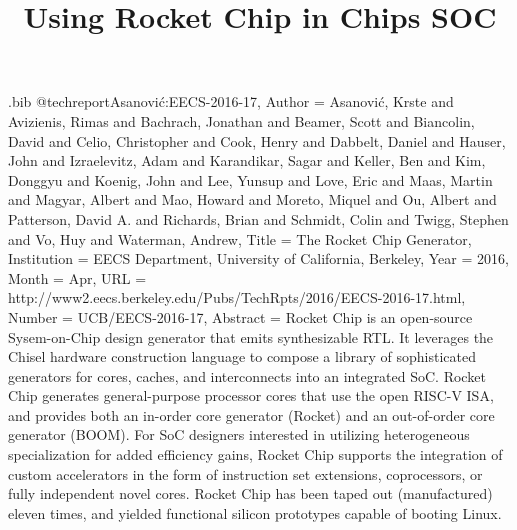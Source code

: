 \begin{filecontents*}{\jobname.bib}
@techreport{Asanović:EECS-2016-17,
    Author = {Asanović, Krste and Avizienis, Rimas and Bachrach, Jonathan and Beamer, Scott and Biancolin, David and Celio, Christopher and Cook, Henry and Dabbelt, Daniel and Hauser, John and Izraelevitz, Adam and Karandikar, Sagar and Keller, Ben and Kim, Donggyu and Koenig, John and Lee, Yunsup and Love, Eric and Maas, Martin and Magyar, Albert and Mao, Howard and Moreto, Miquel and Ou, Albert and Patterson, David A. and Richards, Brian and Schmidt, Colin and Twigg, Stephen and Vo, Huy and Waterman, Andrew},
    Title = {The Rocket Chip Generator},
    Institution = {EECS Department, University of California, Berkeley},
    Year = {2016},
    Month = {Apr},
    URL = {http://www2.eecs.berkeley.edu/Pubs/TechRpts/2016/EECS-2016-17.html},
    Number = {UCB/EECS-2016-17},
    Abstract = {Rocket Chip is an open-source Sysem-on-Chip design generator that emits synthesizable RTL. It leverages the Chisel hardware construction language to compose a library of sophisticated generators for cores, caches, and interconnects into an integrated SoC. Rocket Chip generates general-purpose processor cores that use the open RISC-V ISA, and provides both an in-order core generator (Rocket) and an out-of-order core generator (BOOM). For SoC designers interested in utilizing heterogeneous specialization for added efficiency gains, Rocket Chip supports the integration of custom accelerators in the form of instruction set extensions, coprocessors, or fully independent novel cores. Rocket Chip has been taped out (manufactured) eleven times, and yielded functional silicon prototypes capable of booting Linux.}
}
\end{filecontents*}
\documentclass[10pt,conference]{IEEEtran}
\IEEEoverridecommandlockouts
\usepackage{cite}
\usepackage{amsmath,amssymb,amsfonts}
\usepackage{algorithmic}
\usepackage{graphicx}
\usepackage{textcomp}
\usepackage{xcolor}
\usepackage[english]{babel}
\usepackage{blindtext}
\def\BibTeX{{\rm B\kern-.05em{\sc i\kern-.025em b}\kern-.08em
    T\kern-.1667em\lower.7ex\hbox{E}\kern-.125emX}}


\title{Using Rocket Chip in Chips SOC
}

\author{
}

